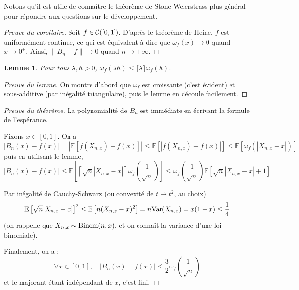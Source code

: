 \documentclass[a4paper, 11pt]{article}
\def\Cf{{\cal{C}}}
\def\E{\mathbb{E}}
\def\Var{\textnormal{Var}}
\newtheorem*{lemma}{Lemme}
\begin{document}
Notons qu'il est utile de connaître le théorème de Stone-Weierstrass plus
général pour répondre aux questions sur le développement.

\begin{proof}[Preuve du corollaire]
  Soit $f \in \Cf([0,1])$. D'après le théorème de Heine, $f$ est uniformément
  continue, ce qui est équivalent à dire que $\omega_f(x) \to 0$ quand $x \to
  0^+$. Ainsi, $\|B_n - f\| \to 0$ quand $n \to +\infty$.
\end{proof}

\begin{lemma}
  Pour tous $\lambda, h > 0$,
  $\omega_f(\lambda h) \leq \lceil \lambda \rceil \omega_f(h)$.
\end{lemma}
\begin{proof}[Preuve du lemme]
  On montre d'abord que $\omega_f$ est croissante (c'est évident) et
  sous-additive (par inégalité triangulaire), puis le lemme en découle
  facilement.
\end{proof}

\begin{proof}[Preuve du théorème]
  La polynomialité de $B_n$ est immédiate en écrivant la formule de l'espérance.

  Fixons $x \in [0,1]$. On a
  \[ |B_n(x) - f(x)| = \left| \E\left[ f(X_{n,x}) - f(x) \right] \right|
    \leq \E\left[ \left| f(X_{n,x}) - f(x) \right| \right]
    \leq \E[\omega_f(|X_{n,x} - x|)]\]
  puis en utilisant le lemme,
  \[ |B_n(x) - f(x)| \leq \E\left[ \left\lceil \sqrt{n} |X_{n,x} - x| \right\rceil
    \omega_f\left( \frac{1}{\sqrt{n}} \right) \right]
    \leq \omega_f\left( \frac{1}{\sqrt{n}} \right)
    \E\left[ \sqrt{n} |X_{n,x} - x| + 1 \right]\]

  Par inégalité de Cauchy-Schwarz (ou convexité de $t \mapsto t^2$, au choix),
  \[  \E\left[ \sqrt{n} |X_{n,x} - x| \right]^2 \leq
    \E\left[ n (X_{n,x} - x)^2 \right] = n \Var(X_{n,x}) = x(1-x) \leq \frac{1}{4} \]
  (on rappelle que $X_{n,x} \sim \textnormal{Binom}(n,x)$, et on connaît la
  variance d'une loi binomiale).

  Finalement, on a :
  \[ \forall x \in [0,1],\quad |B_n(x) - f(x)|
    \leq \frac{3}{2}  \omega_f\left( \frac{1}{\sqrt{n}} \right) \]
  et le majorant étant indépendant de $x$, c'est fini.
\end{proof}
\end{document}
